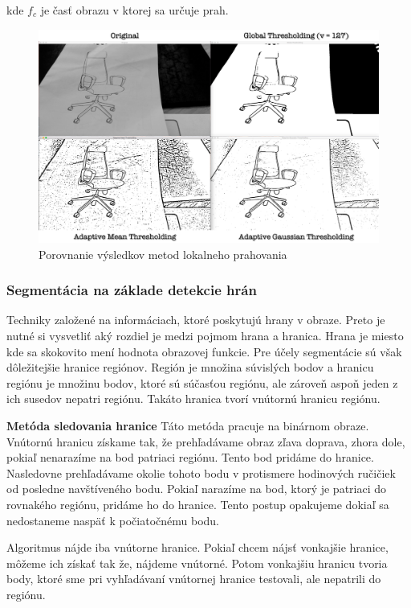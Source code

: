 kde $f_c$ je časť obrazu v ktorej sa určuje prah. 

\begin{figure}[H]
\begin{center}
	\includegraphics[scale=0.15]{obrazky/lokalne_prahovanie}
	\caption{Porovnanie výsledkov metod lokalneho prahovania}
	\end{center}
\end{figure}



\subsubsection{Segmentácia na základe detekcie hrán}
Techniky založené na informáciach, ktoré poskytujú hrany v obraze. Preto je  nutné si vysvetliť aký rozdiel je medzi pojmom hrana a hranica. Hrana je miesto kde sa skokovito mení hodnota obrazovej funkcie. Pre účely segmentácie sú však dôležitejšie hranice regiónov.  Región je množina súvislých bodov a hranicu regiónu je množinu bodov, ktoré sú súčasťou regiónu, ale zároveň aspoň jeden z ich susedov nepatri regiónu. Takáto hranica tvorí vnútornú hranicu regiónu. 

\textbf{Metóda sledovania hranice}
Táto metóda pracuje na binárnom obraze. Vnútornú hranicu získame tak, že  prehľadávame obraz zľava doprava, zhora dole, pokiaľ nenarazíme na bod patriaci regiónu. Tento bod pridáme do hranice. Nasledovne prehľadávame okolie tohoto bodu v protismere hodinových ručičiek od posledne navštíveného bodu. Pokiaľ narazíme na bod, ktorý je patriaci do rovnakého regiónu, pridáme ho do hranice. Tento postup opakujeme dokiaľ sa nedostaneme naspäť k počiatočnému bodu. 

Algoritmus nájde iba vnútorne hranice. Pokiaľ chcem nájsť vonkajšie hranice, môžeme ich získať tak že, nájdeme vnútorné. Potom vonkajšiu hranicu tvoria body, ktoré sme pri vyhľadávaní vnútornej hranice testovali, ale nepatrili do regiónu. 

